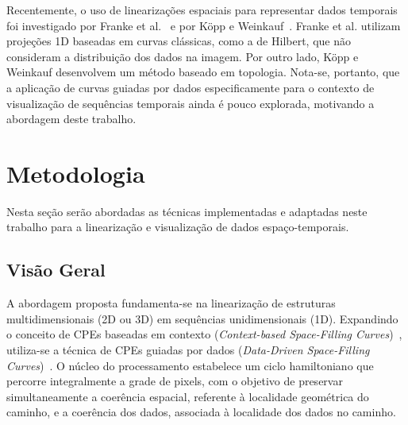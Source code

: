 \documentclass[12pt]{article}
\begin{document}

Recentemente, o uso de linearizações espaciais para representar dados temporais foi investigado por Franke et al.~\cite{franke:21}
e por Köpp e Weinkauf~\cite{KoeppWeinkauf2022_TMTM}. Franke et al. utilizam projeções 1D baseadas em curvas clássicas, como a de
Hilbert, que não consideram a distribuição dos dados na imagem. Por outro lado, Köpp e Weinkauf desenvolvem um método
baseado em topologia. Nota-se, portanto, que a aplicação de curvas guiadas por dados especificamente para o contexto de visualização
de sequências temporais ainda é pouco explorada, motivando a abordagem deste trabalho.

\section{Metodologia}
Nesta seção serão abordadas as técnicas implementadas e adaptadas neste trabalho para a
linearização e visualização de dados espaço-temporais.


\subsection{Visão Geral}

A abordagem proposta fundamenta-se na linearização de estruturas multidimensionais (2D ou 3D) em sequências
unidimensionais (1D). Expandindo o conceito de CPEs baseadas em contexto
(\textit{Context-based Space-Filling Curves})~\cite{dafner:00}, utiliza-se a técnica de CPEs guiadas por
dados (\textit{Data-Driven Space-Filling Curves})~\cite{zhou:20}. O núcleo do processamento estabelece
um ciclo hamiltoniano que percorre integralmente a grade de pixels, com o objetivo de preservar
simultaneamente a coerência espacial, referente à localidade geométrica do caminho, e a coerência dos dados,
associada à localidade dos dados no caminho.
\end{document}
